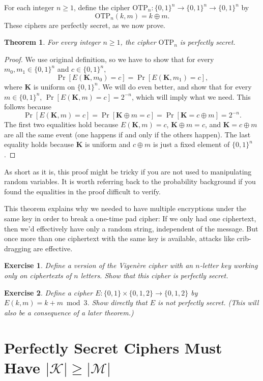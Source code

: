 \documentclass[11pt]{article}
\newtheorem{exercise}{Exercise}
\newtheorem{theorem}{Theorem}
\newcommand{\msgs}{\mathcal{M}}
\newcommand{\keys}{\mathcal{K}}
\newcommand{\enc}{E}
\newcommand{\bits}{\{0,1\}}
\newcommand{\bK}{\mathbf{K}}
\newcommand{\otp}{\mathrm{OTP}}
\begin{document}
For each integer $n\geq 1$, define the cipher $\otp_n : \bits^n\to\bits^n \to
\bits^n$ by
\[
    \otp_n(k,m) = k \oplus m.
\]
These ciphers are perfectly secret, as we now prove.
\begin{theorem}
    For every integer $n\geq 1$, the cipher $\otp_n$ is perfectly secret.
\end{theorem}
\begin{proof} We use original definition, so we have to show that for every
    $m_0,m_1\in\bits^n$ and $c\in\bits^n$,
    \[
        \Pr[\enc(\bK,m_0) = c] = \Pr[\enc(\bK,m_1) = c],
    \]
    where $\bK$ is uniform on $\bits^n$.  We will do even better, and show that
    for every $m\in\bits^n$, $\Pr[\enc(\bK,m) = c] = 2^{-n}$, which will
    imply what we need. This follows because
    \[
        \Pr[\enc(\bK,m) = c] = \Pr[\bK\oplus m=c] = \Pr[\bK=c\oplus m] = 2^{-n}.
    \]
    The first two equalities hold because $\enc(\bK,m)=c$, $\bK\oplus m = c$,
    and $\bK=c\oplus m$ are all the same event (one happens if and only if the
    others happen). The last equality holds because $\bK$ is uniform and
    $c\oplus m$ is just a fixed element of $\bits^n$.
\end{proof}
As short as it is, this proof might be tricky if you are not used to
manipulating random variables. It is worth referring back to the probability
background if you found the equalities in the proof difficult to verify.

This theorem explains why we needed to have multiple encryptions under the same
key in order to break a one-time pad cipher: If we only had one ciphertext,
then we'd effectively have only a random string, independent of the message.
But once more than one ciphertext with the same key is available, attacks like
crib-dragging are effective.

\begin{exercise}
    Define a version of the Vigen\`{e}re cipher with an $n$-letter
    key working only on ciphertexts of $n$ letters. Show that this
    cipher is perfectly secret.
\end{exercise}

\begin{exercise}
    Define a cipher $E:\bits\times\{0,1,2\}\to\{0,1,2\}$ by $E(k,m) = k+m\bmod
    3$. Show directly that $E$ is not perfectly secret. (This will also be a
    consequence of a later theorem.)
\end{exercise}


\section{Perfectly Secret Ciphers Must Have $|\keys| \geq |\msgs|$}
\end{document}
